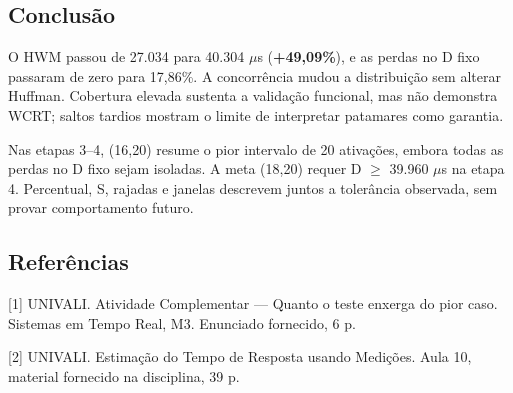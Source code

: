 \subsection{Conclusão}

O HWM passou de 27.034 para 40.304 \ensuremath{\mu}s (\textbf{+49,09\%}), e as perdas no D fixo passaram de zero para 17,86\%. A concorrência mudou a distribuição sem alterar Huffman. Cobertura elevada sustenta a validação funcional, mas não demonstra WCRT; saltos tardios mostram o limite de interpretar patamares como garantia.
\par

Nas etapas 3--4, (16,20) resume o pior intervalo de 20 ativações, embora todas as perdas no D fixo sejam isoladas. A meta (18,20) requer D \ensuremath{\geq} 39.960 \ensuremath{\mu}s na etapa 4. Percentual, S, rajadas e janelas descrevem juntos a tolerância observada, sem provar comportamento futuro.
\par

\subsection*{Referências}

[1] UNIVALI. Atividade Complementar --- Quanto o teste enxerga do pior caso. Sistemas em Tempo Real, M3. Enunciado fornecido, 6 p.
\par

[2] UNIVALI. Estimação do Tempo de Resposta usando Medições. Aula 10, material fornecido na disciplina, 39 p.
\par
